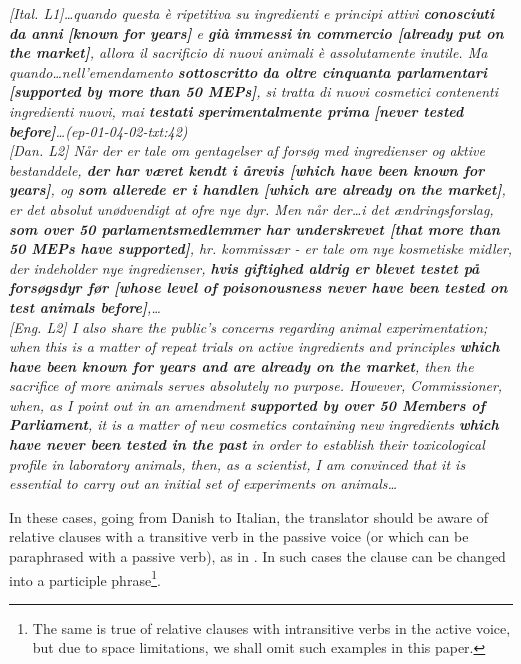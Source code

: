 \documentclass[output=paper]{LSP/langsci}
\begin{document}
\ea\label{ex:korzen:22}
\textit{\textup{[Ital. L1]}\ldots quando questa è ripetitiva su ingredienti e principi attivi \textbf{conosciuti} \textbf{da anni} \textbf{[known for years]} e \textbf{già} \textbf{immessi} \textbf{in commercio [already put on the market]}, allora il sacrificio di nuovi animali è assolutamente inutile. Ma quando\ldots nell'emendamento \textbf{sottoscritto} \textbf{da oltre cinquanta parlamentari [supported by more than 50 MEPs]}, si tratta di nuovi cosmetici contenenti ingredienti nuovi, mai \textbf{testati} \textbf{sperimentalmente prima} \textbf{[never tested before]}\ldots \textup{(ep-01-04-02-txt:42)}\\
  \textup{[Dan. L2] }Når der er tale om gentagelser af forsøg med ingredienser og aktive bestanddele, \textbf{der har været kendt i årevis [which have been known for years]}, og \textbf{som allerede er i handlen [which are already on the market]}, er det absolut unødvendigt at ofre nye dyr. Men når der\ldots i det ændringsforslag, \textbf{som over 50 parlamentsmedlemmer har underskrevet [that more than 50 MEPs have supported]}, hr. kommissær - er tale om nye kosmetiske midler, der indeholder nye ingredienser, \textbf{hvis giftighed aldrig er blevet testet på forsøgsdyr før [whose level of poisonousness never have been tested on test animals before]},\ldots \\
 \textup{[Eng. L2]} I also share the public's concerns regarding animal experimentation; when this is a matter of repeat trials on active ingredients and principles \textbf{which have been known for years and are already on the market}, then the sacrifice of more animals serves absolutely no purpose. However, Commissioner, when, as I point out in an amendment \textbf{supported by over 50 Members of Parliament}, it is a matter of new cosmetics containing new ingredients \textbf{which have never been tested in the past} in order to establish their toxicological profile in laboratory animals, then, as a scientist, I am convinced that it is essential to carry out an initial set of experiments on animals\ldots }
\z

In these cases, going from Danish to Italian, the translator should be aware of relative clauses with a transitive verb in the passive voice (or which can be paraphrased with a passive verb), as in . In such cases the clause can be changed into a participle phrase\footnote{The same is true of relative clauses with intransitive verbs in the active voice, but due to space limitations, we shall omit such examples in this paper.}.
\end{document}
